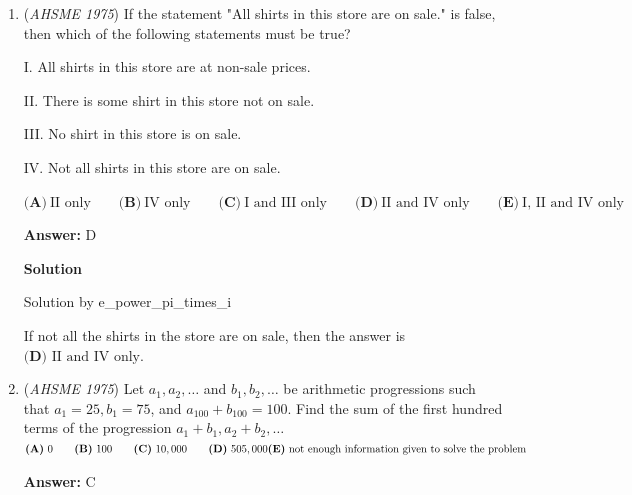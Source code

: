 \begin{enumerate}
 \textbf{Answer: }E



\textbf{Solution}

Solution by e\_power\_pi\_times\_i

 
Notice that if $x$ is negative, then the whole thing would amount to a negative number. Also notice that if $x$ is positive, then $|x-|x|\-|$ would be $0$, hence the whole thing would amount to $0$. Therefore, $\frac{|x-|x|\-|}{x}$ is positive $\boxed{\textbf{(E)}\ \text{for no non-zero real numbers } x}$.

 


	\item (\textit{AHSME 1975}) If the statement "All shirts in this store are on sale." is false, then which of the following statements must be true? 


 I. All shirts in this store are at non-sale prices. 


 II. There is some shirt in this store not on sale. 


 III. No shirt in this store is on sale. 


 IV. Not all shirts in this store are on sale. 


 

$\textbf{(A)}\ \text{II only} \qquad  \textbf{(B)}\ \text{IV only} \qquad  \textbf{(C)}\ \text{I and III only} \qquad  \textbf{(D)}\ \text{II and IV only} \qquad  \textbf{(E)}\ \text{I, II and IV only}$

 \textbf{Answer: }D



\textbf{Solution}

Solution by e\_power\_pi\_times\_i

 
If not all the shirts in the store are on sale, then the answer is $\boxed{\textbf{(D) } \text{II and IV only}}$.

 


	\item (\textit{AHSME 1975}) Let $a_1, a_2, \ldots$ and $b_1, b_2, \ldots$ be arithmetic progressions such that $a_1 = 25, b_1 = 75$, and $a_{100} + b_{100} = 100$. 
Find the sum of the first hundred terms of the progression $a_1 + b_1, a_2 + b_2, \ldots$
$\textbf{(A)}\ 0 \qquad  \textbf{(B)}\ 100 \qquad  \textbf{(C)}\ 10,000 \qquad  \textbf{(D)}\ 505,000 \qquad \\ \textbf{(E)}\ \text{not enough information given to solve the problem}$

 \textbf{Answer: }C




\end{enumerate}
